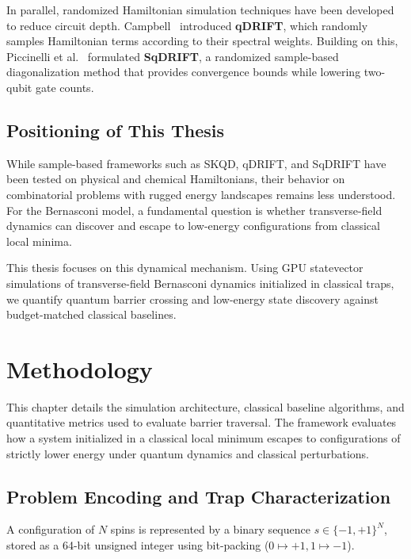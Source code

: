 \documentclass[12pt,a4paper]{report}
\begin{document}
In parallel, randomized Hamiltonian simulation techniques have been developed to reduce circuit depth. Campbell~\cite{campbell2019} introduced \textbf{qDRIFT}, which randomly samples Hamiltonian terms according to their spectral weights. Building on this, Piccinelli et al.~\cite{piccinelli2025} formulated \textbf{SqDRIFT}, a randomized sample-based diagonalization method that provides convergence bounds while lowering two-qubit gate counts.

\section{Positioning of This Thesis}
\label{sec:positioning}
While sample-based frameworks such as SKQD, qDRIFT, and SqDRIFT have been tested on physical and chemical Hamiltonians, their behavior on combinatorial problems with rugged energy landscapes remains less understood. For the Bernasconi model, a fundamental question is whether transverse-field dynamics can discover and escape to low-energy configurations from classical local minima.

This thesis focuses on this dynamical mechanism. Using GPU statevector simulations of transverse-field Bernasconi dynamics initialized in classical traps, we quantify quantum barrier crossing and low-energy state discovery against budget-matched classical baselines.

\chapter{Methodology}
\label{ch:methodology}

This chapter details the simulation architecture, classical baseline algorithms, and quantitative metrics used to evaluate barrier traversal. The framework evaluates how a system initialized in a classical local minimum escapes to configurations of strictly lower energy under quantum dynamics and classical perturbations.

\section{Problem Encoding and Trap Characterization}
\label{sec:trap_formulation}
A configuration of $N$ spins is represented by a binary sequence $s \in \{-1, +1\}^N$, stored as a 64-bit unsigned integer using bit-packing ($0 \mapsto +1, 1 \mapsto -1$).
\end{document}
